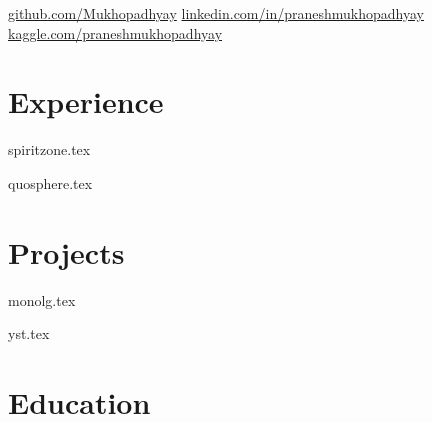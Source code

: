 \documentclass[]{deedy-resume-openfont}
\begin{document}
%
%
\lastupdated

%
%


\namesection{Pranesh}{Mukhopadhyay}{
Mumbai, India \\
\href{mailto:praneshmukherjee7@gmail.com}{praneshmukherjee7@gmail.com} | 96747-70912
}


\href{https://github.com/Mukhopadhyay}{ github.com/Mukhopadhyay} \; \href{https://www.linkedin.com/in/praneshmukhopadhyay/}{ linkedin.com/in/praneshmukhopadhyay} \; \href{https://www.kaggle.com/praneshmukhopadhyay}{ kaggle.com/praneshmukhopadhyay}



\section{Experience}

{spiritzone.tex}

\sectionsep

{quosphere.tex}

\sectionsep


\section{Projects}

{monolg.tex}

\sectionsep

{yst.tex}

\sectionsep

\section{Education}
\end{document}
